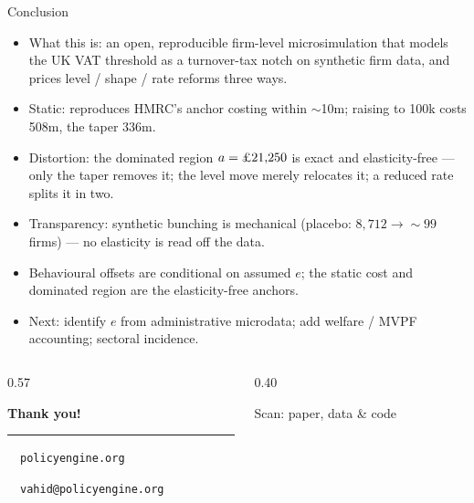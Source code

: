 \documentclass[aspectratio=169]{beamer}
\renewcommand{\pounds}{\ifmmode\text{\textsterling}\else\textsterling\fi}
\begin{document}
\begin{frame}{Conclusion}
  \footnotesize
  \begin{itemize}\itemsep0.12cm
    \item \alert{What this is:} an open, reproducible firm-level microsimulation
      that models the UK VAT threshold as a turnover-tax notch on synthetic firm
      data, and prices level / shape / rate reforms \alert{three ways}.
    \item \alert{Static:} reproduces HMRC's anchor costing within $\sim$\pounds10m;
      raising to \pounds100k costs \pounds508m, the taper \pounds336m.
    \item \alert{Distortion:} the dominated region $a=\pounds21{,}250$ is exact and
      elasticity-free --- \alert{only the taper removes it}; the level move merely
      relocates it; a reduced rate splits it in two.
    \item \alert{Transparency:} synthetic bunching is mechanical (placebo:
      $8{,}712 \to \sim99$ firms) --- no elasticity is read off the data.
    \item \alert{Behavioural offsets} are conditional on assumed $e$; the static
      cost and dominated region are the elasticity-free anchors.
    \item \alert{Next:} identify $e$ from administrative microdata; add welfare /
      MVPF accounting; sectoral incidence.
  \end{itemize}
\end{frame}

{
\begin{frame}
  \vfill
  \begin{columns}[c]
    \begin{column}{0.57\textwidth}
      \raggedright
      {\fontsize{22}{26}\selectfont\bfseries\color{pedarkteal}Thank you!\par}
      \vspace{0.35cm}
      {\color{peteal}\rule{0.55\textwidth}{1pt}}\par
      \vspace{0.75cm}
      {\color{pedarkteal}\faGlobe~~\texttt{policyengine.org}\par}
      \vspace{0.28cm}
      {\color{pedarkteal}\faEnvelope~~\texttt{vahid@policyengine.org}\par}
    \end{column}
    \begin{column}{0.40\textwidth}
      \centering
      \\[0.5em]
      {\footnotesize\color{pegray}Scan: paper, data \& code\par}
    \end{column}
  \end{columns}
  \vfill
\end{frame}
}
\end{document}
